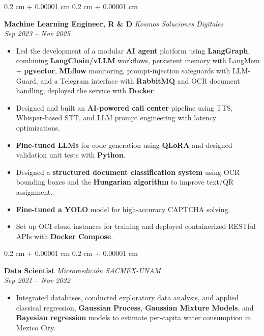 \documentclass[10pt, letterpaper]{article}
\newenvironment{highlights}{
    \begin{itemize}[
        topsep=0.10 cm,
        parsep=0.10 cm,
        partopsep=0pt,
        itemsep=0pt,
        leftmargin=0.4 cm + 10pt
    ]
}{
    \end{itemize}
}
\newenvironment{onecolentry}{
    \begin{adjustwidth}{
        0.2 cm + 0.00001 cm
    }{
        0.2 cm + 0.00001 cm
    }
}{
    \end{adjustwidth}
}
\begin{document}
\begin{onecolentry}
\textbf{Machine Learning Engineer, R \& D} \hfill \textit{Kosmos Soluciones Digitales} \\
\textit{Sep 2023 -- Nov 2025}
\begin{highlights}
    \item Led the development of a modular \textbf{AI agent} platform using \textbf{LangGraph}, combining \textbf{LangChain/vLLM} workflows, persistent memory with LangMem + \textbf{pgvector}, \textbf{MLflow} monitoring, prompt-injection safeguards with LLM-Guard, and a Telegram interface with \textbf{RabbitMQ} and OCR document handling; deployed the service with \textbf{Docker}.
    \item Designed and built an \textbf{AI-powered call center} pipeline using TTS, Whisper-based STT, and LLM prompt engineering with latency optimizations.
    \item \textbf{Fine-tuned LLMs} for code generation using \textbf{QLoRA} and designed validation unit tests with \textbf{Python}.
    \item Designed a \textbf{structured document classification system} using OCR bounding boxes and the \textbf{Hungarian algorithm} to improve text/QR assignment.
    \item \textbf{Fine-tuned a YOLO} model for high-accuracy CAPTCHA solving.
    \item Set up OCI cloud instances for training and deployed containerized RESTful APIs with \textbf{Docker Compose}.
\end{highlights}
\end{onecolentry}

\vspace{0.15 cm}

\begin{onecolentry}
\textbf{Data Scientist} \hfill \textit{Micromedición SACMEX-UNAM} \\
\textit{Sep 2021 -- Nov 2022}
\begin{highlights}
    \item Integrated databases, conducted exploratory data analysis, and applied classical regression, \textbf{Gaussian Process}, \textbf{Gaussian Mixture Models}, and \textbf{Bayesian regression} models to estimate per-capita water consumption in Mexico City.
\end{highlights}
\end{onecolentry}

\vspace{0.15 cm}
\end{document}
